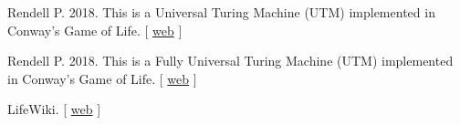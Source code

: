 \documentclass{article}
\begin{document}
\noindent 
  Rendell P. 2018. This is a Universal Turing Machine (UTM) implemented in Conway's Game of Life. [
\href{http://rendell-attic.org/gol/utm/index.htm}{web}
]
  

\vspace*{0.2cm}


\noindent 
  Rendell P. 2018. This is a Fully Universal Turing Machine (UTM) implemented in Conway's Game of Life. [
\href{http://rendell-attic.org/gol/fullutm/index.htm}{web}
]
  

\vspace*{0.2cm}


\noindent 
  LifeWiki. [
\href{http://www.conwaylife.com/wiki/}{web}
]
  

\vspace*{0.2cm}
\end{document}
